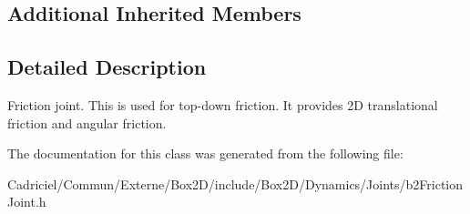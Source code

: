 \subsection*{Additional Inherited Members}


\subsection{Detailed Description}
Friction joint. This is used for top-\/down friction. It provides 2D translational friction and angular friction. 

The documentation for this class was generated from the following file\+:\begin{DoxyCompactItemize}
\item 
Cadriciel/\+Commun/\+Externe/\+Box2\+D/include/\+Box2\+D/\+Dynamics/\+Joints/b2\+Friction\+Joint.\+h\end{DoxyCompactItemize}
